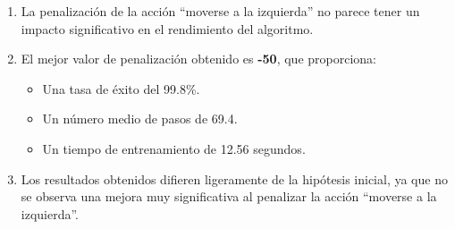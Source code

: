 \begin{enumerate}
    \item La penalización de la acción ``moverse a la izquierda'' no parece tener un impacto significativo en el rendimiento del algoritmo.
    \item El mejor valor de penalización obtenido es \textbf{-50}, que proporciona:
    \begin{itemize}
        \item Una tasa de éxito del 99.8\%.
        \item Un número medio de pasos de 69.4.
        \item Un tiempo de entrenamiento de 12.56 segundos.
    \end{itemize}
    \item Los resultados obtenidos difieren ligeramente de la hipótesis inicial, ya que no se observa una mejora muy significativa al penalizar la acción ``moverse a la izquierda''.
\end{enumerate}